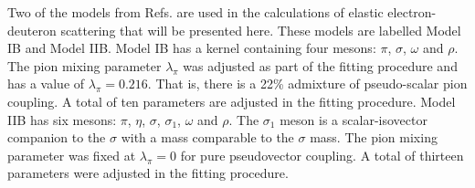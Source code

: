 \documentclass[mythesis.tex]{subfiles}
\begin{document}
Two of the models from Refs. \cite{FVOHA,FVOHB} are used in the calculations of
elastic
electron-deuteron scattering that will be presented here. These models are
labelled Model IB and Model IIB. Model IB has a kernel containing four
mesons: $\pi$, $\sigma$, $\omega$ and $\rho$. The pion mixing parameter
$\lambda_\pi$ was adjusted as part of the fitting procedure and has a
value of $\lambda_\pi=0.216$. That is, there is a 22\% admixture of
pseudo-scalar pion coupling. A total of ten parameters are adjusted in
the fitting procedure. Model IIB has six mesons: $\pi$, $\eta$, $\sigma$,
$\sigma_1$, $\omega$ and $\rho$. The $\sigma_1$ meson is a scalar-isovector
companion to the $\sigma$ with a mass comparable to the $\sigma$ mass.
The pion mixing parameter was fixed at $\lambda_\pi=0$ for pure pseudovector
coupling. A total of thirteen parameters were adjusted in the fitting
procedure.
\end{document}
